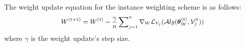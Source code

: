 The weight update equation for the instance weighting scheme is as follows:
\begin{equation}
\small
    \begin{aligned}
        {W}^{(t+1)} = {W}^{(t)} - \frac{\gamma}{n} \sum\nolimits_{j=1}^{n}\nabla_{W}\mathcal{L}_{V_j}(\mathcal{A}lg(\boldsymbol{\theta}^{(t)}_{W},\mathcal{V}_j^{S}))
    \end{aligned}
    \label{online-equation-weight}
\end{equation}
where $\gamma$ is the weight update's step size.
